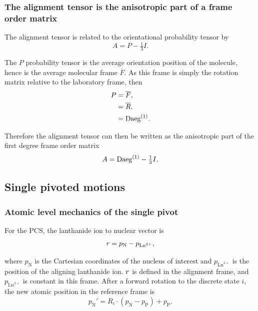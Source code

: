 \subsubsection{The alignment tensor is the anisotropic part of a frame order matrix}

The alignment tensor is related to the orientational probability tensor by
\begin{equation}
    A = P - \tfrac{1}{3} I .
\end{equation}

The $P$ probability tensor is the average orientation position of the molecule, hence is the average molecular frame $\overline{F}$.
As this frame is simply the rotation matrix relative to the laboratory frame, then
\begin{subequations}
\begin{align}
    P &= \overline{F} , \\
      &= \overline{R} , \\
      &= \textrm{Daeg}^{(1)} .
\end{align}
\end{subequations}

Therefore the alignment tensor can then be written as the anisotropic part of the first degree frame order matrix
\begin{equation}
    A = \textrm{Daeg}^{(1)} - \tfrac{1}{3} I .
\end{equation}





\subsection{Single pivoted motions}




\subsubsection{Atomic level mechanics of the single pivot}

For the PCS, the lanthanide ion to nuclear vector is
\begin{equation}
    r = p_{\textrm{N}} - p_{\textrm{Ln}^{3+}},
\end{equation}

where $p_{\textrm{N}}$ is the Cartesian coordinates of the nucleus of interest and $p_{\textrm{Ln}^{3+}}$ is the position of the aligning lanthanide ion.
$r$ is defined in the alignment frame, and $p_{\textrm{Ln}^{3+}}$ is constant in this frame.
After a forward rotation to the discrete state $i$, the new atomic position in the reference frame is
\begin{equation}
    p_{\textrm{N}}' = R_i \cdot \left( p_{\textrm{N}} - p_{\textrm{P}} \right) + p_{\textrm{P}}.
\end{equation}

